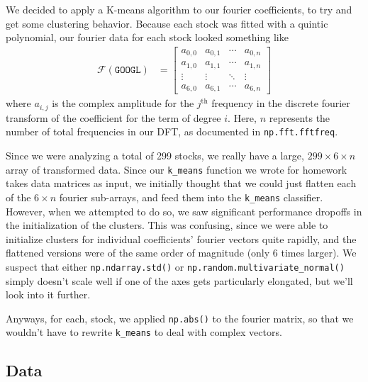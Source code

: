 \documentclass[final]{article}
\begin{document}
We decided to apply a K-means algorithm to our fourier coefficients,
to try and get some clustering behavior. Because each stock was fitted
with a quintic polynomial, our fourier data for each stock looked
something like
\begin{align*}
  \mathcal{F}(\texttt{GOOGL})
  &=
    \begin{bmatrix}
      a_{0,0} & a_{0,1} & \cdots & a_{0,n} \\
      a_{1,0} & a_{1,1} & \cdots & a_{1,n} \\
      \vdots & \vdots & \ddots & \vdots \\
      a_{6,0} & a_{6,1} & \cdots & a_{6,n}
    \end{bmatrix}
\end{align*}
where $a_{i,j}$ is the complex amplitude for the $j^{\text{th}}$
frequency in the discrete fourier transform of the coefficient for the
term of degree $i$. Here, $n$ represents the number of total
frequencies in our DFT, as documented in \texttt{np.fft.fftfreq}.

Since we were analyzing a total of 299 stocks, we really have a large,
$299 \times 6 \times n$ array of transformed data. Since our
\texttt{k\_means} function we wrote for homework takes data matrices
as input, we initially thought that we could just flatten each of the
$6 \times n $ fourier sub-arrays, and feed them into the
\texttt{k\_means} classifier. However, when we attempted to do so, we
saw significant performance dropoffs in the initialization of the
clusters. This was confusing, since we were able to initialize
clusters for individual coefficients' fourier vectors quite rapidly,
and the flattened versions were of the same order of magnitude (only 6
times larger). We suspect that either \texttt{np.ndarray.std()} or
\texttt{np.random.multivariate\_normal()} simply doesn't scale well if
one of the axes gets particularly elongated, but we'll look into it
further.

Anyways, for each, stock, we applied \texttt{np.abs()} to the fourier
matrix, so that we wouldn't have to rewrite \texttt{k\_means} to deal
with complex vectors.


\subsection{Data}
\end{document}
